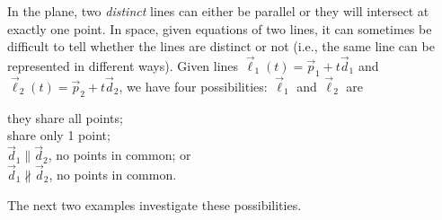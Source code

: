 In the plane, two \emph{distinct} lines can either be parallel or they will intersect at exactly one point. In space, given equations of two lines, it can sometimes be difficult to tell whether the lines are distinct or not (i.e., the same line can be represented in different ways). Given lines $\vec\ell_1(t) = \vec p_1 + t\vec d_1$ and $\vec \ell_2(t) = \vec p_2+t\vec d_2$, we have four possibilities: $\vec \ell_1$ and $\vec \ell_2$ are
\begin{center}
\begin{minipage}{250pt}
 they share all points;\\
 share only 1 point;\\
 $\vec d_1\parallel \vec d_2$, no points in common; or \\
 $\vec d_1\nparallel \vec d_2$, no points in common.
\end{minipage}
\end{center}

The next two examples investigate these possibilities.

